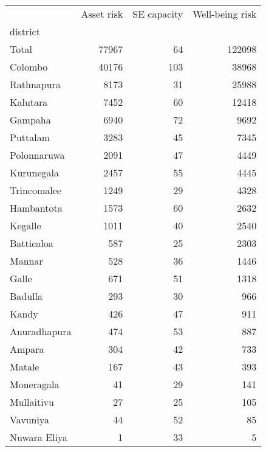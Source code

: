 \begin{tabular}{lrrr}
\toprule
{} &  Asset risk &  SE capacity &  Well-being risk \\
district     &             &              &                  \\
\midrule
Total        &       77967 &           64 &           122098 \\
Colombo      &       40176 &          103 &            38968 \\
Rathnapura   &        8173 &           31 &            25988 \\
Kalutara     &        7452 &           60 &            12418 \\
Gampaha      &        6940 &           72 &             9692 \\
Puttalam     &        3283 &           45 &             7345 \\
Polonnaruwa  &        2091 &           47 &             4449 \\
Kurunegala   &        2457 &           55 &             4445 \\
Trincomalee  &        1249 &           29 &             4328 \\
Hambantota   &        1573 &           60 &             2632 \\
Kegalle      &        1011 &           40 &             2540 \\
Batticaloa   &         587 &           25 &             2303 \\
Mannar       &         528 &           36 &             1446 \\
Galle        &         671 &           51 &             1318 \\
Badulla      &         293 &           30 &              966 \\
Kandy        &         426 &           47 &              911 \\
Anuradhapura &         474 &           53 &              887 \\
Ampara       &         304 &           42 &              733 \\
Matale       &         167 &           43 &              393 \\
Moneragala   &          41 &           29 &              141 \\
Mullaitivu   &          27 &           25 &              105 \\
Vavuniya     &          44 &           52 &               85 \\
Nuwara Eliya &           1 &           33 &                5 \\
\bottomrule
\end{tabular}
